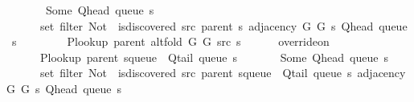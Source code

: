 \begin{isabellebody}
\ \ \ \ \ \ {\isacharparenleft}{\kern0pt}{\isasymlambda}{\isacharunderscore}{\kern0pt}{\isachardot}{\kern0pt}\ Some\ {\isacharparenleft}{\kern0pt}Q{\isacharunderscore}{\kern0pt}head\ {\isacharparenleft}{\kern0pt}queue\ s{\isacharparenright}{\kern0pt}{\isacharparenright}{\kern0pt}{\isacharparenright}{\kern0pt}\isanewline
\ \ \ \ \ \ {\isacharparenleft}{\kern0pt}set\ {\isacharparenleft}{\kern0pt}filter\ {\isacharparenleft}{\kern0pt}Not\ {\isasymcirc}\ is{\isacharunderscore}{\kern0pt}discovered\ src\ {\isacharparenleft}{\kern0pt}parent\ s{\isacharparenright}{\kern0pt}{\isacharparenright}{\kern0pt}\ {\isacharparenleft}{\kern0pt}adjacency\ G{}\ G{}\ s\ {\isacharparenleft}{\kern0pt}Q{\isacharunderscore}{\kern0pt}head\ {\isacharparenleft}{\kern0pt}queue\ s{\isacharparenright}{\kern0pt}{\isacharparenright}{\kern0pt}{\isacharparenright}{\kern0pt}{\isacharparenright}{\kern0pt}{\isacharparenright}{\kern0pt}{\isachardoublequoteclose}\isanewline
%
\isadelimproof
%
\endisadelimproof
%
\isatagproof
{}\isamarkupfalse%
\ {\isacharminus}{\kern0pt}\isanewline
\ \ \isamarkupfalse%
\isanewline
\ \ \ \ {\isachardoublequoteopen}P{\isacharunderscore}{\kern0pt}lookup\ {\isacharparenleft}{\kern0pt}parent\ {\isacharparenleft}{\kern0pt}alt{\isacharunderscore}{\kern0pt}fold\ G{}\ G{}\ src\ s{\isacharparenright}{\kern0pt}{\isacharparenright}{\kern0pt}\ {\isacharequal}{\kern0pt}\isanewline
\ \ \ \ \ override{\isacharunderscore}{\kern0pt}on\isanewline
\ \ \ \ \ \ {\isacharparenleft}{\kern0pt}P{\isacharunderscore}{\kern0pt}lookup\ {\isacharparenleft}{\kern0pt}parent\ {\isacharparenleft}{\kern0pt}s{\isasymlparr}queue\ {\isacharcolon}{\kern0pt}{\isacharequal}{\kern0pt}\ Q{\isacharunderscore}{\kern0pt}tail\ {\isacharparenleft}{\kern0pt}queue\ s{\isacharparenright}{\kern0pt}{\isasymrparr}{\isacharparenright}{\kern0pt}{\isacharparenright}{\kern0pt}{\isacharparenright}{\kern0pt}\isanewline
\ \ \ \ \ \ {\isacharparenleft}{\kern0pt}{\isasymlambda}{\isacharunderscore}{\kern0pt}{\isachardot}{\kern0pt}\ Some\ {\isacharparenleft}{\kern0pt}Q{\isacharunderscore}{\kern0pt}head\ {\isacharparenleft}{\kern0pt}queue\ s{\isacharparenright}{\kern0pt}{\isacharparenright}{\kern0pt}{\isacharparenright}{\kern0pt}\isanewline
\ \ \ \ \ \ {\isacharparenleft}{\kern0pt}set\ {\isacharparenleft}{\kern0pt}filter\ {\isacharparenleft}{\kern0pt}Not\ {\isasymcirc}\ is{\isacharunderscore}{\kern0pt}discovered\ src\ {\isacharparenleft}{\kern0pt}parent\ {\isacharparenleft}{\kern0pt}s{\isasymlparr}queue\ {\isacharcolon}{\kern0pt}{\isacharequal}{\kern0pt}\ Q{\isacharunderscore}{\kern0pt}tail\ {\isacharparenleft}{\kern0pt}queue\ s{\isacharparenright}{\kern0pt}{\isasymrparr}{\isacharparenright}{\kern0pt}{\isacharparenright}{\kern0pt}{\isacharparenright}{\kern0pt}\ {\isacharparenleft}{\kern0pt}adjacency\ G{}\ G{}\ s\ {\isacharparenleft}{\kern0pt}Q{\isacharunderscore}{\kern0pt}head\ {\isacharparenleft}{\kern0pt}queue\ s{\isacharparenright}{\kern0pt}{\isacharparenright}{\kern0pt}{\isacharparenright}{\kern0pt}{\isacharparenright}{\kern0pt}{\isacharparenright}{\kern0pt}{\isachardoublequoteclose}\isanewline

\end{isabellebody}

